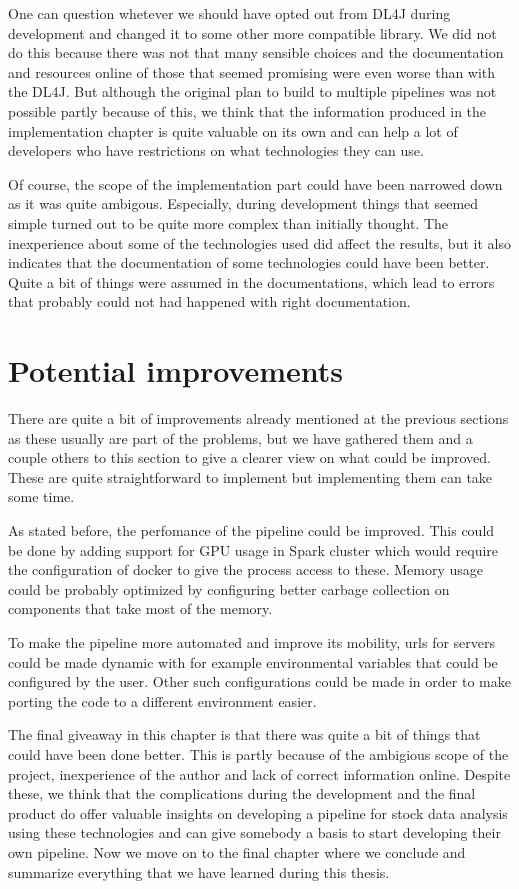 One can question whetever we should have opted out from DL4J during development and changed it to some other more compatible library.
We did not do this because there was not that many sensible choices and the documentation and resources online of those that seemed promising were even worse than with the DL4J.
But although the original plan to build to multiple pipelines was not possible partly because of this, we think that the information produced in the implementation chapter is quite valuable on its own and can help a lot of developers who have restrictions on what technologies they can use.

Of course, the scope of the implementation part could have been narrowed down as it was quite ambigous.
Especially, during development things that seemed simple turned out to be quite more complex than initially thought.
The inexperience about some of the technologies used did affect the results, but it also indicates that the documentation of some technologies could have been better.
Quite a bit of things were assumed in the documentations, which lead to errors that probably could not had happened with right documentation.

\section{Potential improvements}

There are quite a bit of improvements already mentioned at the previous sections as these usually are part of the problems, but we have gathered them and a couple others to this section to give a clearer view on what could be improved.
These are quite straightforward to implement but implementing them can take some time.

As stated before, the perfomance of the pipeline could be improved.
This could be done by adding support for GPU usage in Spark cluster which would require the configuration of docker to give the process access to these.
Memory usage could be probably optimized by configuring better carbage collection on components that take most of the memory.

To make the pipeline more automated and improve its mobility, urls for servers could be made dynamic with for example environmental variables that could be configured by the user.
Other such configurations could be made in order to make porting the code to a different environment easier.

The final giveaway in this chapter is that there was quite a bit of things that could have been done better. 
This is partly because of the ambigious scope of the project, inexperience of the author and lack of correct information online.
Despite these, we think that the complications during the development and the final product do offer valuable insights on developing a pipeline for stock data analysis using these technologies and can give somebody a basis to start developing their own pipeline.
Now we move on to the final chapter where we conclude and summarize everything that we have learned during this thesis.